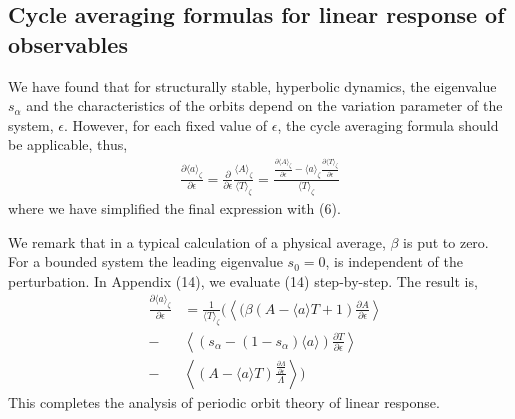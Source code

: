 \documentclass[pre,aps,twocolumn,showpacs,hyperref]{revtex4-1} %
\begin{document}
\subsection{Cycle averaging formulas for linear response of observables}
We have found that for structurally stable, hyperbolic dynamics, the eigenvalue $s_{\alpha}$ and the characteristics of the orbits depend on the variation parameter of the system, $\epsilon$. However, for each fixed value of $\epsilon$, the cycle averaging formula should be applicable, thus,
\begin{eqnarray}
\frac{\partial \langle a\rangle_{\zeta}}{\partial \epsilon} = \frac{\partial}{\partial \epsilon}\frac{\langle A \rangle_{\zeta}}{\langle T \rangle_{\zeta}} =
\frac{\frac{\partial \langle A \rangle_{\zeta}}{\partial \epsilon} - \langle a \rangle_{\zeta}\frac{\partial \langle T \rangle_{\zeta}}{\partial \epsilon}}{\langle T \rangle_{\zeta}}
\end{eqnarray}
where we have simplified the final expression with (6).

\indent We remark that in a typical calculation of a physical average, $\beta$ is put to zero. For a bounded system the leading eigenvalue $s_{0}=0$, is independent of the perturbation. In Appendix (14), we evaluate (14) step-by-step. The result is,
\begin{eqnarray*}
&\frac{\partial \langle a\rangle_{\zeta}}{\partial \epsilon}& = \frac{1}{\langle T \rangle_{\zeta}}\Bigg( \left\langle (\beta(A-\langle a\rangle T + 1)\frac{\partial A}{\partial \epsilon}\right\rangle \\ &-& \left\langle (s_{\alpha}-(1-s_{\alpha})\langle a\rangle)\frac{\partial T}{\partial \epsilon}\right\rangle  \\
&-&\left\langle (A-\langle a \rangle T) \frac{\frac{\partial \Lambda}{\partial \epsilon}}{\Lambda}\right\rangle \Bigg)
\end{eqnarray*}
This completes the analysis of periodic orbit theory of linear response.
\end{document}
